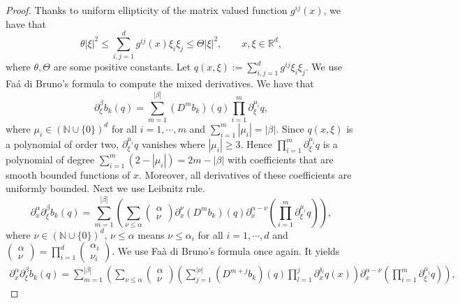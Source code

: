 \documentclass[10pt,a4paper]{amsart}
\begin{document}
	\begin{proof}
		Thanks to uniform ellipticity of the matrix valued function $g^{ij}(x)$, we have that
		\[
		\theta |\xi|^2 \leq \sum_{i,j=1}^d g^{ij}(x)\xi_i\xi_j\leq \Theta |\xi|^2,
		\qquad x,\xi\in\mathbb{R}^d,
		\]
		where $\theta, \Theta$ are some positive constants. Let $q(x,\xi):=\sum_{i,j=1}^d g^{ij}\xi_i\xi_j$. We use Fa\'a di Bruno's formula to compute the mixed derivatives. We have that  
		\[
		\partial^{\beta}_{\xi} b_k(q)= \sum_{m=1}^{|\beta|} (D^m b_k)(q) \prod_{i=1}^m \partial_{\xi}^{\mu_i} q, 
		\]
		where $\mu_i\in (\mathbb{N}\cup\{0\})^d$ for all $i=1,\cdots,m$ and $\displaystyle{\sum_{i=1}^m |\mu_i|=|\beta|}$. Since $q(x,\xi)$ is a polynomial of order two, $\partial_{\xi}^{\mu_i}q$ vanishes where $|\mu_i|\geq 3$. Hence $\displaystyle{\prod_{i=1}^m \partial_{\xi}^{\mu_i} q}$ is a polynomial of degree $\displaystyle{\sum_{i=1}^m (2-|\mu_i|)}=2m-|\beta|$ with coefficients that are smooth bounded functions of $x$. Moreover, all derivatives of these coefficients are uniformly bounded. Next we use Leibnitz rule. 
		\[
		\partial_{x}^{\alpha}\partial_{\xi}^{\beta} b_k(q)= \sum_{m=1}^{|\beta|} \left( \sum_{\nu\leq \alpha} \begin{pmatrix}
			\alpha\\ \nu
		\end{pmatrix} \partial^{\nu}_{x}(D^m b_k)(q) \partial^{\alpha-\nu}_{x}\left(\prod_{i=1}^m \partial_{\xi}^{\mu_i} q\right)\right),
		\]
		where $\nu\in(\mathbb{N}\cup\{0\})^d$, $\nu\leq \alpha$ means $\nu\leq \alpha_i$ for all $i=1,\cdots, d$ and $\displaystyle{\begin{pmatrix}
				\alpha\\ \nu
			\end{pmatrix}=\prod_{i=1}^d \begin{pmatrix}
				\alpha_i\\ \nu_i
		\end{pmatrix}}$. We use Fa\`a di Bruno's formula once again. It yields
		\begin{align}\label{intermediate 1}
			\partial_{x}^{\alpha}\partial_{\xi}^{\beta} b_k(q)= \sum_{m=1}^{|\beta|} \left( \sum_{\nu\leq \alpha} \begin{pmatrix}
				\alpha\\ \nu
			\end{pmatrix} \left(\sum_{j=1}^{|\nu|} (D^{m+j} b_k)(q) \prod_{l=1}^{j} \partial_x^{\delta_l} q(x)\right) \partial^{\alpha-\nu}_{x}\left(\prod_{i=1}^m \partial_{\xi}^{\mu_i} q\right)\right),
		\end{align}

\end{proof}
\end{document}
